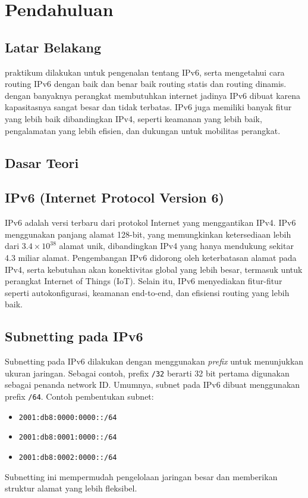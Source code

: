\section{Pendahuluan}
\subsection{Latar Belakang}
praktikum dilakukan untuk pengenalan tentang IPv6, serta mengetahui cara routing IPv6 dengan baik dan benar baik routing statis dan routing dinamis. dengan banyaknya perangkat membutuhkan internet jadinya IPv6 dibuat karena kapasitasnya sangat besar dan tidak terbatas. IPv6 juga memiliki banyak fitur yang lebih baik dibandingkan IPv4, seperti keamanan yang lebih baik, pengalamatan yang lebih efisien, dan dukungan untuk mobilitas perangkat.\\

\subsection{Dasar Teori}
\subsection*{IPv6 (Internet Protocol Version 6)}

IPv6 adalah versi terbaru dari protokol Internet yang menggantikan IPv4. IPv6 menggunakan panjang alamat 128-bit, yang memungkinkan ketersediaan lebih dari $3.4 \times 10^{38}$ alamat unik, dibandingkan IPv4 yang hanya mendukung sekitar 4.3 miliar alamat. Pengembangan IPv6 didorong oleh keterbatasan alamat pada IPv4, serta kebutuhan akan konektivitas global yang lebih besar, termasuk untuk perangkat Internet of Things (IoT). Selain itu, IPv6 menyediakan fitur-fitur seperti autokonfigurasi, keamanan end-to-end, dan efisiensi routing yang lebih baik.

\subsection*{Subnetting pada IPv6}

Subnetting pada IPv6 dilakukan dengan menggunakan \textit{prefix} untuk menunjukkan ukuran jaringan. Sebagai contoh, prefix \texttt{/32} berarti 32 bit pertama digunakan sebagai penanda network ID. Umumnya, subnet pada IPv6 dibuat menggunakan prefix \texttt{/64}. Contoh pembentukan subnet:
\begin{itemize}
    \item \texttt{2001:db8:0000:0000::/64}
    \item \texttt{2001:db8:0001:0000::/64}
    \item \texttt{2001:db8:0002:0000::/64}
\end{itemize}
Subnetting ini mempermudah pengelolaan jaringan besar dan memberikan struktur alamat yang lebih fleksibel.

